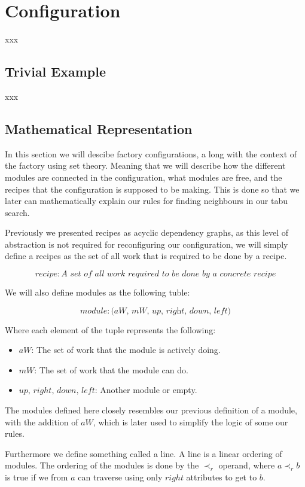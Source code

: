 \chapter{Configuration}
xxx

\section{Trivial Example}
xxx

\section{Mathematical Representation}

In this section we will descibe factory configurations, a long with the context of the factory using set theory. Meaning that we will describe how the different modules are connected in the configuration, what modules are free, and the recipes that the configuration is supposed to be making. This is done so that we later can mathematically explain our rules for finding neighbours in our tabu search.

Previously we presented recipes as acyclic dependency graphs, as this level of abstraction is not required for reconfiguring our configuration, we will simply define a recipes as the set of all work that is required to be done by a recipe.

\[recipe: \textit{A set of all work required to be done by a concrete recipe}\]

\noindent We will also define modules as the following tuble:

\[module: \textit{(aW, mW, up, right, down, left)}\]

\noindent Where each element of the tuple represents the following:
\begin{itemize}
\item $aW$: The set of work that the module is actively doing.
\item $mW$: The set of work that the module can do.
\item $up,\, right,\, down,\, left$: Another module or empty.
\end{itemize}

The modules defined here closely resembles our previous definition of a module, with the addition of $aW$, which is later used to simplify the logic of some our rules.

Furthermore we define something called a line. A line is a linear ordering of modules. The ordering of the modules is done by the $\prec_r$ operand, where $a \prec_r b$ is true if we from $a$ can traverse using only $right$ attributes to get to $b$.

